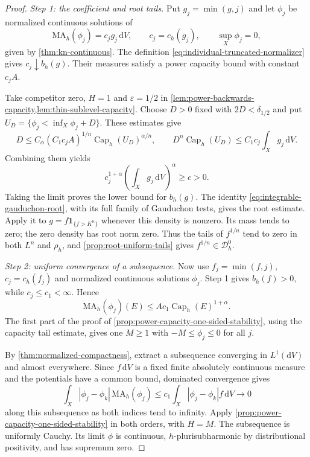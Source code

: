 \begin{proof}
\emph{Step 1: the coefficient and root tails.} Put $g_j=\min(g,j)$ and let $\phi_j$ be normalized continuous solutions of
\[
 \mathrm{MA}_h(\phi_j)=c_jg_j\,\mathrm dV,
 \qquad c_j=c_h(g_j),\qquad \sup_X\phi_j=0,
\]
given by \cref{thm:kn-continuous}. The definition \eqref{eq:individual-truncated-normalizer} gives $c_j\downarrow b_h(g)$. Their measures satisfy a power capacity bound with constant $c_jA$.

Take competitor zero, $H=1$ and $\varepsilon=1/2$ in \cref{lem:power-backwards-capacity,lem:thin-sublevel-capacity}. Choose $D>0$ fixed with $2D<\delta_{1/2}$ and put $U_D=\{\phi_j<\inf_X\phi_j+D\}$. These estimates give
\[
 D\leq C_\alpha(C_1c_jA)^{1/n}
                   \operatorname{Cap}_h(U_D)^{\alpha/n},
 \qquad
 D^n\operatorname{Cap}_h(U_D)
       \leq C_1c_j\int_Xg_j\,\mathrm dV.
\]
Combining them yields
\[
 c_j^{1+\alpha}\left(\int_Xg_j\,\mathrm dV\right)^\alpha\geq c>0.
\]
Taking the limit proves the lower bound for $b_h(g)$. The identity \eqref{eq:integrable-gauduchon-root}, with its full family of Gauduchon tests, gives the root estimate. Apply it to $g=f\mathbf1_{\{f>K^n\}}$ whenever this density is nonzero. Its mass tends to zero; the zero density has root norm zero. Thus the tails of $f^{1/n}$ tend to zero in both $L^n$ and $\rho_h$, and \cref{prop:root-uniform-tails} gives $f^{1/n}\in\mathcal D_h^0$.

\emph{Step 2: uniform convergence of a subsequence.} Now use $f_j=\min(f,j)$, $c_j=c_h(f_j)$ and normalized continuous solutions $\phi_j$. Step 1 gives $b_h(f)>0$, while $c_j\leq c_1<\infty$. Hence
\[
 \mathrm{MA}_h(\phi_j)(E)
       \leq Ac_1\operatorname{Cap}_h(E)^{1+\alpha}.
\]
The first part of the proof of \cref{prop:power-capacity-one-sided-stability}, using the capacity tail estimate, gives one $M\geq1$ with $-M\leq\phi_j\leq0$ for all $j$.

By \cref{thm:normalized-compactness}, extract a subsequence converging in $L^1(\mathrm dV)$ and almost everywhere. Since $f\,\mathrm dV$ is a fixed finite absolutely continuous measure and the potentials have a common bound, dominated convergence gives
\[
 \int_X|\phi_j-\phi_k|\,\mathrm{MA}_h(\phi_j)
 \leq c_1\int_X|\phi_j-\phi_k|f\,\mathrm dV\longrightarrow0
\]
along this subsequence as both indices tend to infinity. Apply \cref{prop:power-capacity-one-sided-stability} in both orders, with $H=M$. The subsequence is uniformly Cauchy. Its limit $\phi$ is continuous, $h$-plurisubharmonic by distributional positivity, and has supremum zero.


\end{proof}
